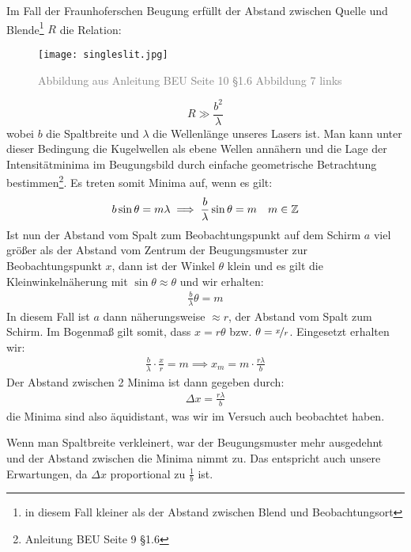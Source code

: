 	Im Fall der Fraunhoferschen Beugung erfüllt der Abstand zwischen Quelle und Blende\footnote{in diesem Fall kleiner als der Abstand zwischen Blend und Beobachtungsort} $R$ die Relation:
	\begin{wrapfigure}{r}{0.45\textwidth} 
		\vspace{-10pt}
		\begin{center}
			\texttt{[image: singleslit.jpg]}
			\caption{\textcolor{gray}{Abbildung aus Anleitung BEU Seite 10 §1.6 Abbildung 7 links}}
			\label{fig:singleslit-geo}
		\end{center}
		\vspace{-10pt}
	\end{wrapfigure} 
	\begin{equation}
		R \gg \frac{b^2}{\lambda}
	\end{equation}
	wobei $b$ die Spaltbreite und $\lambda$ die Wellenlänge unseres Lasers ist. Man kann unter dieser Bedingung die Kugelwellen als ebene Wellen annähern und die Lage der Intensitätminima im Beugungsbild durch einfache geometrische Betrachtung bestimmen\footnote{Anleitung BEU Seite 9 §1.6}. Es treten somit Minima auf, wenn es gilt:
	\begin{align}
		b \sin \theta = m \lambda \implies \frac{b}{\lambda}\sin\theta = m && m \in \mathbb{Z}
	\end{align}
	Ist nun der Abstand vom Spalt zum Beobachtungspunkt auf dem Schirm $a$ viel größer als der Abstand vom Zentrum der Beugungsmuster zur Beobachtungspunkt $x$, dann ist der Winkel $\theta$ klein und es gilt die Kleinwinkelnäherung mit $\sin\theta \approx \theta$ und wir erhalten:
	\begin{align}
		\frac{b}{\lambda}\theta = m
	\end{align}
	In diesem Fall ist $a$ dann näherungsweise $\approx r$, der Abstand vom Spalt zum Schirm. Im Bogenmaß gilt somit, dass $x = r\theta$ bzw. $\theta = \nicefrac{x}{r}$. Eingesetzt erhalten wir:
	\begin{align}
		\frac{b}{\lambda}\cdot\frac{x}{r} = m \implies x_m = m \cdot \frac{r\lambda}{b}
	\end{align}
	Der Abstand zwischen 2 Minima ist dann gegeben durch:
	\begin{align}
		\Delta x = \frac{r\lambda}{b}
	\end{align}
	die Minima sind also äquidistant, was wir im Versuch auch beobachtet haben.

	Wenn man Spaltbreite verkleinert, war der Beugungsmuster mehr ausgedehnt und der Abstand zwischen die Minima nimmt zu. Das entspricht auch unsere Erwartungen, da $\Delta x$ proportional zu $\frac{1}{b}$ ist. 